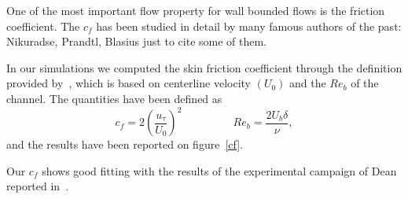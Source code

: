 One of the most important flow property for wall bounded flows is the friction coefficient.
The $c_{f}$ has been studied in detail by many famous authors of the past: Nikuradse, Prandtl, Blasius just to cite some of them. \par
In our simulations we computed the skin friction coefficient through the definition provided by~\cite[279]{pope}, which is based on centerline velocity $(U_{0})$ and the $Re_{b}$ of the channel.
The quantities have been defined as
\begin{equation*}
c_{f}= 2(\frac{u_{\tau}}{U_{0}})^{2}	\quad~\quad~\quad~\quad	Re_{b}= \frac{2 U_{b} \delta}{\nu},
\end{equation*}
and the results have been reported on figure~\ref{cf}. \par
Our $c_{f}$ shows good fitting with the results of the experimental campaign of Dean reported in~\cite{Dean}.\\~\par

